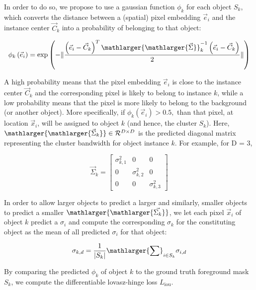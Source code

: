\documentclass{midl} %
\begin{document}
In order to do so, we propose to use a gaussian function $\phi_{k}$ for each object $S_{k}$, which converts the distance between a (spatial) pixel embedding $\vec{e}_{i}$ and the instance center $\vec{C}_{k}$ into a probability of belonging to that object:

\begin{equation}
\phi_{k} \left( \vec{e}_{i} \right) = \exp \left( -\lVert \frac{ \left( \vec{e}_{i} - \vec{C}_{k} \right)^{T} \mathlarger{\mathlarger{\vec{\Sigma}}}_{k}^{-1} \left( \vec{e}_{i} - \vec{C}_{k} \right)}{2} \rVert \right)    
 \label{eqgauss}
\end{equation}

A high probability means that the pixel embedding $\vec{e}_{i}$ is close to the instance center  $\vec{C}_{k}$ and the corresponding pixel is likely to belong to instance $k$, while a low probability means that the pixel is more likely to belong to the background (or another object). More specifically, if $\phi_{k}(\vec{e}_{i})>0.5,$ than that pixel, at location $\vec{x}_{i}$, will be assigned to object $k$ (and hence, the cluster $S_{k}$). Here, $\mathlarger{\mathlarger{\vec{\Sigma}_{k}}} \in \mathcal{R}^{D \times D}$ is the predicted diagonal matrix representing the cluster bandwidth for object instance $k$. For example, for D = 3, 

\begin{equation}
    \vec{\Sigma}_{k} = \begin{bmatrix}
    \sigma^{2}_{k, 1} & 0 & 0 \\
    0 & \sigma^{2}_{k, 2} & 0 \\
    0 & 0 & \sigma^{2}_{k, 3}
    \end{bmatrix}
\end{equation}

In order to allow larger objects to predict a larger  and similarly, smaller objects to predict a smaller $\mathlarger{\mathlarger{\vec{\Sigma_{k}}}}$, we let each pixel $\vec{x}_{i}$ of object $k$ predict a $\sigma_{i}$ and compute the corresponding $\sigma_{k}$ for the constituting object as the mean of all predicted $\sigma_{i}$ for that object:

\begin{equation}
    \sigma_{k, d} = \frac{1}{\vert S_{k} \vert} \mathlarger{\sum}_{i \in S_{k}} \sigma_{i, d}
\end{equation}

By comparing the predicted $\phi_{k}$ of object $k$ to the ground truth foreground mask $S_{k}$, we compute the differentiable lovasz-hinge loss $L_{\text{iou}}$.
\end{document}

